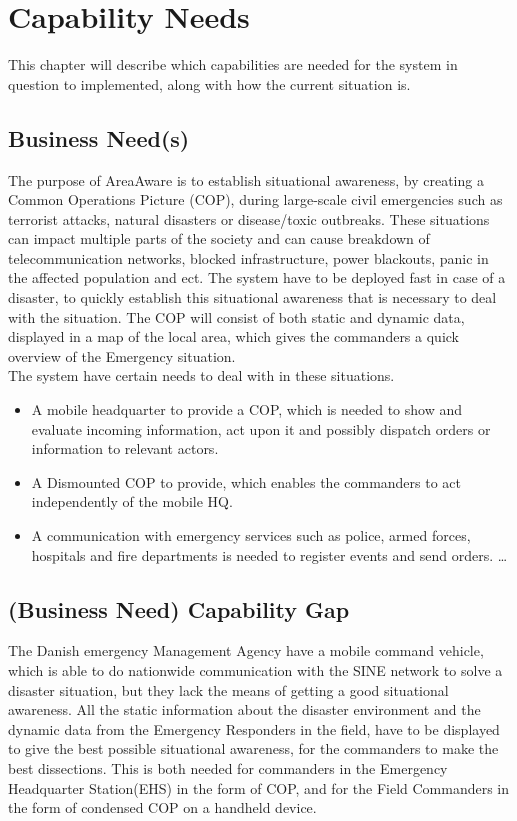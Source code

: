 \label{chp_need}
\chapter{Capability Needs}

This chapter will describe which capabilities are needed for the system in question to implemented, along with how the current situation is.

\section{Business Need(s)}

The purpose of AreaAware is to establish situational awareness, by creating a Common Operations Picture (COP), during large-scale civil emergencies such as terrorist attacks, natural disasters or disease/toxic outbreaks. These situations can impact multiple parts of the society and can cause breakdown of telecommunication networks, blocked infrastructure, power blackouts, panic in the affected population and ect. The system have to be deployed fast in case of a disaster, to quickly establish this situational awareness that is necessary to deal with the situation. The COP will consist of both static and dynamic data, displayed in a map of the local area, which gives the commanders a quick overview of the Emergency situation. \\

The system have certain needs to deal with in these situations.

\begin{itemize}
  \item A mobile headquarter to provide a COP, which is needed to show and evaluate incoming information, act upon it and possibly dispatch orders or information to relevant actors.
  \item A Dismounted COP to provide, which enables the commanders to act independently of the mobile HQ.
  \item A communication with emergency services such as police, armed forces, hospitals and fire departments is needed to register events and send orders. \ldots
\end{itemize}

\section{(Business Need) Capability Gap}

The Danish emergency Management Agency have a mobile command vehicle, which is able to do nationwide communication with the SINE network to solve a disaster situation, but they lack the means of getting a good situational awareness. All the static information about the disaster environment and the dynamic data from the Emergency Responders in the field, have to be displayed to give the best possible situational awareness, for the commanders to make the best dissections. This is both needed for commanders in the Emergency Headquarter Station(EHS) in the form of COP, and for the Field Commanders in the form of condensed COP on a handheld device.

